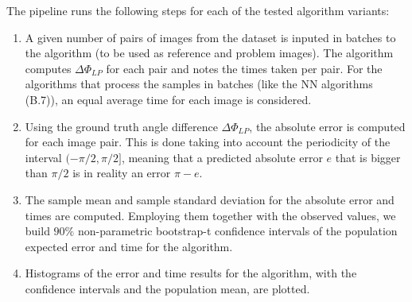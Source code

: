 \documentclass[11pt, a4paper, twoside]{article} %
\begin{document}
The pipeline runs the following steps for each of the tested algorithm variants:\vspace{-0.3cm}
\begin{enumerate}
\item A given number of pairs of images from the dataset is inputed in batches to the algorithm (to be used as reference and problem images). The algorithm computes $\Delta \Phi_{LP}$ for each pair and notes the times taken per pair. For the algorithms that process the samples in batches (like the NN algorithms (B.7)), an equal average time for each image is considered.

\item Using the ground truth angle difference $\Delta \Phi_{LP}$, the absolute error is computed for each image pair. This is done taking into account the periodicity of the interval $(-\pi/2,\pi/2]$, meaning that a predicted absolute error $e$ that is bigger than $\pi/2$ is in reality an error $\pi-e$.

\item The sample mean and sample standard deviation for the absolute error and times are computed. Employing them together with the observed values, we build $90\%$ non-parametric bootstrap-t confidence intervals of the population expected error and time for the algorithm.

\item Histograms of the error and time results for the algorithm, with the confidence intervals and the population mean, are plotted.

\end{enumerate}\vspace{-0.3cm}
\end{document}
